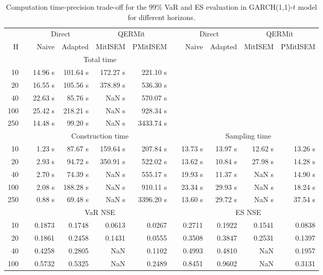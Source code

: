 { \renewcommand{\arraystretch}{1.3} 
\begin{table}[h] 
\centering 
\caption{Computation time-precision trade-off for the  $99\%$ VaR and ES evaluation in GARCH(1,1)-$t$ model for different horizons.} 
\label{tab:time_precision_t_garch2_noS} 
\begin{tabular}{rr rrrr r rrrr}  
 & & \multicolumn{2}{c}{Direct} & \multicolumn{2}{c}{QERMit}&  & \multicolumn{2}{c}{Direct} & \multicolumn{2}{c}{QERMit} \\ \cline{3-6} \cline{8-11} 
 H & & Naive & Adapted & MitISEM & PMitISEM & & Naive & Adapted & MitISEM & PMitISEM \\ \hline 
 & & \multicolumn{4}{c}{Total time}  \\ \cline{3-6} 
10 & & 14.96 s & 101.64 s & 172.27 s & 221.10 s \\ 
20 & & 16.55 s & 105.56 s & 378.89 s & 536.30 s \\ 
40 & & 22.63 s & 85.76 s &  NaN s & 570.07 s \\ 
100 & & 25.42 s & 218.21 s &  NaN s & 928.34 s \\ 
250 & & 14.48 s & 99.20 s &  NaN s & 3433.74 s \\ 
\hline 
 & & \multicolumn{4}{c}{Construction time} & & \multicolumn{4}{c}{ Sampling time} \\ \cline{3-6}  \cline{8-11}
10 & & 1.23 s & 87.67 s & 159.64 s & 207.84 s && 13.73 s & 13.97 s & 12.62 s & 13.26 s \\ 
20 & & 2.93 s & 94.72 s & 350.91 s & 522.02 s && 13.62 s & 10.84 s & 27.98 s & 14.28 s \\ 
40 & & 2.70 s & 74.39 s &  NaN s & 555.17 s && 19.93 s & 11.37 s &  NaN s & 14.90 s \\ 
100 & & 2.08 s & 188.28 s &  NaN s & 910.11 s && 23.34 s & 29.93 s &  NaN s & 18.24 s \\ 
250 & & 0.88 s & 69.48 s &  NaN s & 3396.20 s && 13.60 s & 29.72 s &  NaN s & 37.54 s \\ 
\hline 
 & & \multicolumn{4}{c}{VaR NSE} &&  \multicolumn{4}{c}{ES NSE} \\ \cline{3-6}  \cline{8-11}
10 && 0.1873  & 0.1748  & 0.0613 & 0.0267 && 0.2711  & 0.1922  & 0.1541 & 0.0838 \\ 
20 && 0.1861  & 0.2458  & 0.1431 & 0.0555 && 0.3508  & 0.3847  & 0.2531 & 0.1397 \\ 
40 && 0.4258  & 0.2805  &    NaN & 0.1102 && 0.4993  & 0.4810  &    NaN & 0.1957 \\ 
100 && 0.5732  & 0.5325  &    NaN & 0.2489 && 0.8451  & 0.9602  &    NaN & 0.3131 \\ 

\end{tabular}
\end{table}}

